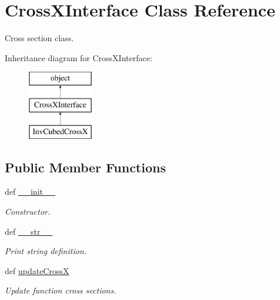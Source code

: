 \hypertarget{classsrc_1_1_cross_x_interface_1_1_cross_x_interface}{\section{Cross\-X\-Interface Class Reference}
\label{classsrc_1_1_cross_x_interface_1_1_cross_x_interface}
}


Cross section class.  


Inheritance diagram for Cross\-X\-Interface\-:\begin{figure}[H]
\begin{center}
\leavevmode
\includegraphics[height=3.000000cm]{classsrc_1_1_cross_x_interface_1_1_cross_x_interface}
\end{center}
\end{figure}
\subsection*{Public Member Functions}
\begin{DoxyCompactItemize}
\item 
def \hyperlink{classsrc_1_1_cross_x_interface_1_1_cross_x_interface_ac775ee34451fdfa742b318538164070e}{\-\_\-\-\_\-init\-\_\-\-\_\-}
\begin{DoxyCompactList}\small\item\em Constructor. \end{DoxyCompactList}\item 
def \hyperlink{classsrc_1_1_cross_x_interface_1_1_cross_x_interface_aa7a4b9bc0941308e362738503137460e}{\-\_\-\-\_\-str\-\_\-\-\_\-}
\begin{DoxyCompactList}\small\item\em Print string definition. \end{DoxyCompactList}\item 
def \hyperlink{classsrc_1_1_cross_x_interface_1_1_cross_x_interface_a738b60650d40ca81094acdae3cc55657}{update\-Cross\-X}
\begin{DoxyCompactList}\small\item\em Update function cross sections. \end{DoxyCompactList}\end{DoxyCompactItemize}
